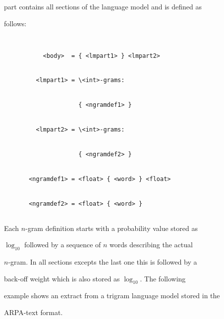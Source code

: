 part contains all sections of the language model and is defined as


follows:


\begin{verbatim}


           <body>  = { <lmpart1> } <lmpart2>


         <lmpart1> = \<int>-grams: 


                     { <ngramdef1> }


         <lmpart2> = \<int>-grams: 


                     { <ngramdef2> }


       <ngramdef1> = <float> { <word> } <float>


       <ngramdef2> = <float> { <word> } 


\end{verbatim}


Each $n$-gram definition starts with a probability value stored as


$\log_{10}$ followed by a sequence of $n$ words describing the actual


$n$-gram. In all sections excepts the last one this is followed by a


back-off weight which is also stored as $\log_{10}$. The following


example shows an extract from a trigram language model stored in the


ARPA-text format.





